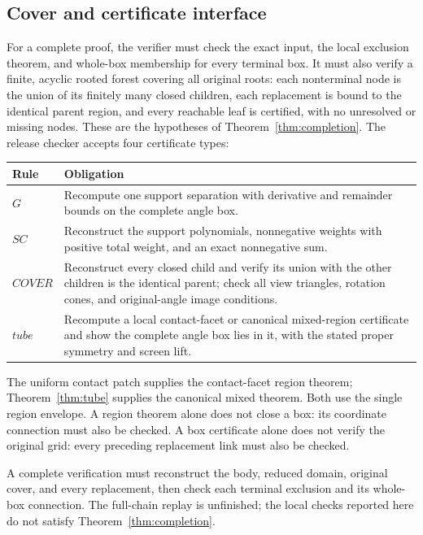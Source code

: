 \documentclass[11pt]{amsart}
\newcommand{\file}[1]{\path{#1}}
\theoremstyle{definition}
\theoremstyle{remark}
\begin{document}
\subsection{Cover and certificate interface}\label{sec:interface}
For a complete proof, the verifier must check the exact input, the local
exclusion theorem, and whole-box membership for every terminal box. It
must also verify a finite, acyclic rooted forest covering all original
roots: each nonterminal node is the union of its finitely many closed
children, each replacement is bound to the identical parent region, and
every reachable leaf is certified, with no unresolved or missing nodes.
These are the hypotheses of Theorem~\ref{thm:completion}.
The release checker accepts four certificate types:
\begin{center}
\begin{tabular}{@{}p{}p{}@{}}
\toprule
Rule & Obligation\\
\midrule
$G$ & Recompute one support separation with derivative and remainder
bounds on the complete angle box.\\
$SC$ & Reconstruct the support polynomials, nonnegative weights with
positive total weight, and an exact nonnegative sum.\\
$COVER$ & Reconstruct every closed child and verify its union with the
other children is the identical parent; check all view triangles,
rotation cones, and original-angle image conditions.\\
$tube$ & Recompute a local contact-facet or canonical mixed-region
certificate and show the complete angle box lies in it, with the stated
proper symmetry and screen lift.\\
\bottomrule
\end{tabular}
\end{center}
The uniform contact patch supplies the contact-facet region theorem;
Theorem~\ref{thm:tube} supplies the canonical mixed theorem. Both use the
single \file{j45-region-v1} region envelope. A region theorem alone does
not close a box: its coordinate connection must also be checked. A box
certificate alone does not verify the original grid: every preceding
replacement link must also be checked.

A complete verification must reconstruct the body, reduced domain,
original cover, and every replacement, then check each terminal exclusion
and its whole-box connection. The full-chain replay is unfinished; the
local checks reported here do not satisfy Theorem~\ref{thm:completion}.
\end{document}
